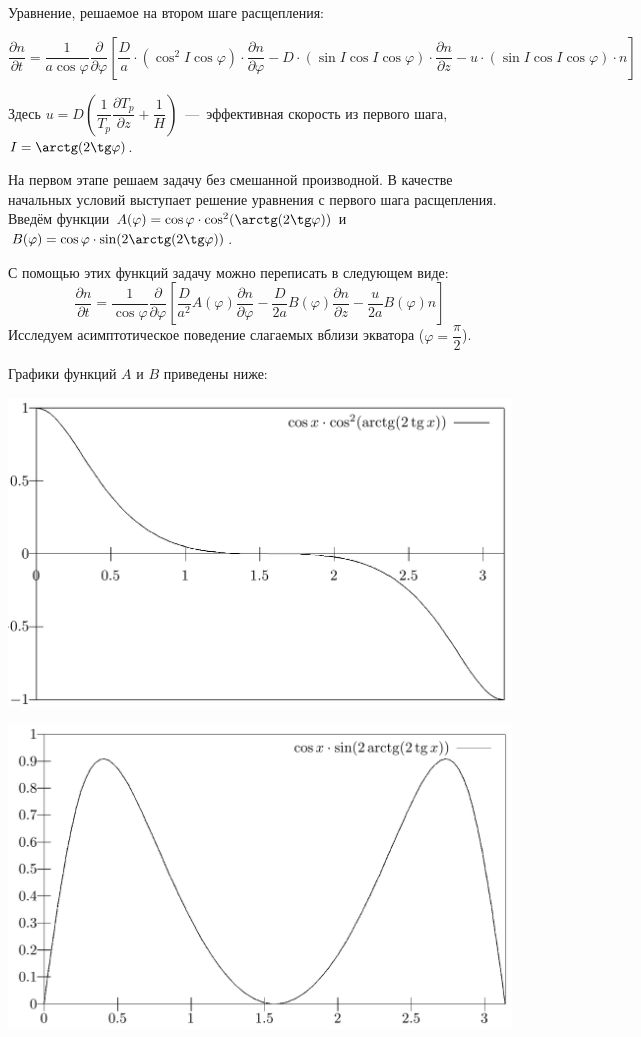 \documentclass[2pt, a4paper, fleqn]{extarticle}
\begin{document}
Уравнение, решаемое на втором шаге расщепления:

$$\dfrac{\partial n}{\partial t} = \dfrac{1}{a\cos\varphi} \dfrac{\partial }{\partial \varphi}\left[\dfrac{D}{a}\cdot(\cos^2  I \cos\varphi)\cdot\dfrac{\partial n}{\partial \varphi}-D\cdot(\sin I\cos I\cos\varphi)\cdot \dfrac{\partial n}{\partial z} - u\cdot(\sin I \cos I \cos\varphi)\cdot n \right]$$

Здесь $u = D\left(\dfrac{1}{T_p}\dfrac{\partial T_p}{\partial z}+\dfrac{1}{H}\right)$~---~эффективная скорость из первого шага, $I = \arctg(2\tg \varphi)$.

На первом этапе решаем задачу без смешанной производной. В качестве начальных условий выступает решение уравнения с первого шага расщепления. Введём функции $A(\varphi) = \cos \varphi \cdot \cos^2(\arctg(2\tg \varphi))$ и $B(\varphi) = \cos\varphi \cdot \sin(2\arctg(2\tg \varphi))$.

С помощью этих функций задачу можно переписать в следующем виде: 
$$\dfrac{\partial n}{\partial t} = \dfrac{1}{\cos\varphi} \dfrac{\partial }{\partial \varphi}\left[\dfrac{D}{a^2}A(\varphi)\dfrac{\partial n}{\partial \varphi}-\dfrac{D}{2a}B(\varphi) \dfrac{\partial n}{\partial z} - \dfrac{u}{2a}B(\varphi) n \right]$$
Исследуем асимптотическое поведение слагаемых вблизи экватора ($\varphi = \dfrac{\pi}{2}$).

Графики функций $A$ и $B$ приведены ниже: 

\includegraphics[scale=0.3]{A}

\includegraphics[scale=0.3]{B}
\end{document}

